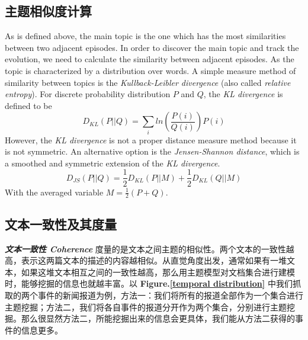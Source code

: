 \subsection{主题相似度计算}
As is defined above, the main topic is the one which has the most similarities between two adjacent episodes. In order to discover the main topic and track the evolution, we need to calculate the similarity between adjacent episodes. As the topic is characterized by a distribution over words. A simple measure method of similarity between topics is the \emph{Kullback-Leibler divergence} (also called \emph{relative entropy}). For discrete probability distribution $P$ and $Q$, the \emph{KL divergence} is defined to be
\begin{equation}
D_{KL} \left ( P||Q \right ) = \sum_{i}ln\left ( \frac{P(i)}{Q(i)} \right ) P(i)
\end{equation}
However, the \emph{KL divergence} is not a proper distance measure method because it is not symmetric. An alternative option is the \emph{Jensen-Shannon distance}, which is a smoothed and symmetric extension of the \emph{KL divergence}.
\begin{equation}
D_{JS} \left ( P||Q \right ) = \frac{1}{2} D_{KL} \left ( P||M \right ) + \frac{1}{2} D_{KL} \left ( Q||M \right )
\end{equation}
With the averaged variable $M = \frac{1}{2}(P+Q)$. 

\subsection{文本一致性及其度量}
\textbf{\emph{文本一致性 Coherence}} 度量的是文本之间主题的相似性。两个文本的一致性越高，表示这两篇文本的描述的内容越相似。从直觉角度出发，通常如果有一堆文本，如果这堆文本相互之间的一致性越高，那么用主题模型对文档集合进行建模时，能够挖掘的信息也就越丰富。以 \textbf{Figure.\ref{temporal distribution}} 中我们抓取的两个事件的新闻报道为例，方法一：我们将所有的报道全部作为一个集合进行主题挖掘；方法二，我们将各自事件的报道分开作为两个集合，分别进行主题挖掘。那么很显然方法二，所能挖掘出来的信息会更具体，我们能从方法二获得的事件的信息更多。

